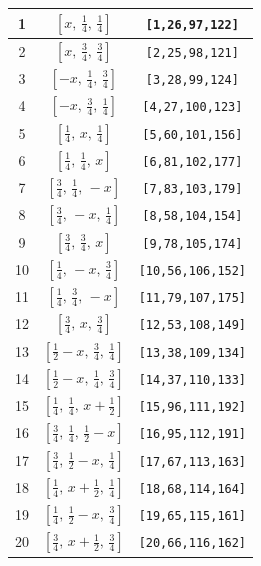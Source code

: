 \documentclass[fleqn,8pt]{jsarticle}
\begin{document}
\begin{longtable}{ccc}
1 & $\left[ x,\, \frac{1}{4},\, \frac{1}{4} \right]$ & {\tt [1,26,97,122]} \\ \hline
2 & $\left[ x,\, \frac{3}{4},\, \frac{3}{4} \right]$ & {\tt [2,25,98,121]} \\ \hline
3 & $\left[ - x,\, \frac{1}{4},\, \frac{3}{4} \right]$ & {\tt [3,28,99,124]} \\ \hline
4 & $\left[ - x,\, \frac{3}{4},\, \frac{1}{4} \right]$ & {\tt [4,27,100,123]} \\ \hline
5 & $\left[ \frac{1}{4},\, x,\, \frac{1}{4} \right]$ & {\tt [5,60,101,156]} \\ \hline
6 & $\left[ \frac{1}{4},\, \frac{1}{4},\, x \right]$ & {\tt [6,81,102,177]} \\ \hline
7 & $\left[ \frac{3}{4},\, \frac{1}{4},\, - x \right]$ & {\tt [7,83,103,179]} \\ \hline
8 & $\left[ \frac{3}{4},\, - x,\, \frac{1}{4} \right]$ & {\tt [8,58,104,154]} \\ \hline
9 & $\left[ \frac{3}{4},\, \frac{3}{4},\, x \right]$ & {\tt [9,78,105,174]} \\ \hline
10 & $\left[ \frac{1}{4},\, - x,\, \frac{3}{4} \right]$ & {\tt [10,56,106,152]} \\ \hline
11 & $\left[ \frac{1}{4},\, \frac{3}{4},\, - x \right]$ & {\tt [11,79,107,175]} \\ \hline
12 & $\left[ \frac{3}{4},\, x,\, \frac{3}{4} \right]$ & {\tt [12,53,108,149]} \\ \hline
13 & $\left[ \frac{1}{2} - x,\, \frac{3}{4},\, \frac{1}{4} \right]$ & {\tt [13,38,109,134]} \\ \hline
14 & $\left[ \frac{1}{2} - x,\, \frac{1}{4},\, \frac{3}{4} \right]$ & {\tt [14,37,110,133]} \\ \hline
15 & $\left[ \frac{1}{4},\, \frac{1}{4},\, x + \frac{1}{2} \right]$ & {\tt [15,96,111,192]} \\ \hline
16 & $\left[ \frac{3}{4},\, \frac{1}{4},\, \frac{1}{2} - x \right]$ & {\tt [16,95,112,191]} \\ \hline
17 & $\left[ \frac{3}{4},\, \frac{1}{2} - x,\, \frac{1}{4} \right]$ & {\tt [17,67,113,163]} \\ \hline
18 & $\left[ \frac{1}{4},\, x + \frac{1}{2},\, \frac{1}{4} \right]$ & {\tt [18,68,114,164]} \\ \hline
19 & $\left[ \frac{1}{4},\, \frac{1}{2} - x,\, \frac{3}{4} \right]$ & {\tt [19,65,115,161]} \\ \hline
20 & $\left[ \frac{3}{4},\, x + \frac{1}{2},\, \frac{3}{4} \right]$ & {\tt [20,66,116,162]} \\ \hline

\end{longtable}
\end{document}
